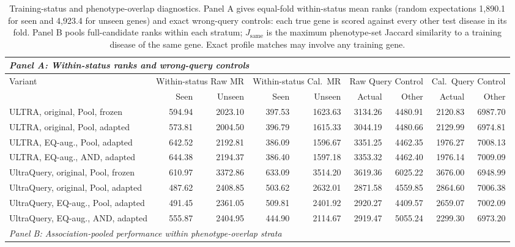 \begin{landscape}
\begin{table}[tb]
\centering\footnotesize
\caption{Training-status and phenotype-overlap diagnostics. Panel A gives equal-fold within-status mean ranks (random expectations 1,890.1 for seen and 4,923.4 for unseen genes) and exact wrong-query controls: each true gene is scored against every other test disease in its fold. Panel B pools full-candidate ranks within each stratum; $J_{\mathrm{same}}$ is the maximum phenotype-set Jaccard similarity to a training disease of the same gene. Exact profile matches may involve any training gene.}
\label{tab:ultra_diagnostics}
\begin{adjustbox}{max width=\linewidth}
\begin{tabular}{lrrrrrrrr}
\toprule
\multicolumn{9}{l}{\emph{Panel A: Within-status ranks and wrong-query controls}} \\
\midrule
Variant & \multicolumn{2}{c}{Within-status Raw MR} & \multicolumn{2}{c}{Within-status Cal.\ MR} & \multicolumn{2}{c}{Raw Query Control} & \multicolumn{2}{c}{Cal.\ Query Control} \\
 & Seen & Unseen & Seen & Unseen & Actual & Other & Actual & Other \\
\midrule
ULTRA, original, Pool, frozen & 594.94 & 2023.10 & 397.53 & 1623.63 & 3134.26 & 4480.91 & 2120.83 & 6987.70 \\
ULTRA, original, Pool, adapted & 573.81 & 2004.50 & 396.79 & 1615.33 & 3044.19 & 4480.66 & 2129.99 & 6974.81 \\
ULTRA, EQ-aug., Pool, adapted & 642.52 & 2192.81 & 386.09 & 1596.67 & 3351.25 & 4462.35 & 1976.27 & 7008.13 \\
ULTRA, EQ-aug., AND, adapted & 644.38 & 2194.37 & 386.40 & 1597.18 & 3353.32 & 4462.40 & 1976.14 & 7009.09 \\
UltraQuery, original, Pool, frozen & 610.97 & 3372.86 & 633.09 & 3514.20 & 3619.36 & 6025.22 & 3676.00 & 6948.99 \\
UltraQuery, original, Pool, adapted & 487.62 & 2408.85 & 503.62 & 2632.01 & 2871.58 & 4559.85 & 2864.60 & 7006.38 \\
UltraQuery, EQ-aug., Pool, adapted & 491.45 & 2361.05 & 509.81 & 2401.92 & 2920.27 & 4409.57 & 2659.07 & 7002.09 \\
UltraQuery, EQ-aug., AND, adapted & 555.87 & 2404.95 & 444.90 & 2114.67 & 2919.47 & 5055.24 & 2299.30 & 6973.20 \\
\midrule
\multicolumn{9}{l}{\emph{Panel B: Association-pooled performance within phenotype-overlap strata}} \\

\end{tabular}
\end{adjustbox}
\end{table}
\end{landscape}

